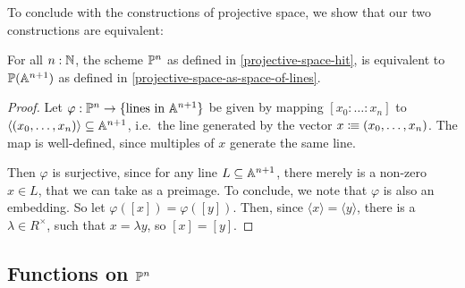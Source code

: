 To conclude with the constructions of projective space,
we show that our two constructions are equivalent:

\begin{proposition}
  \label{space-of-lines-is-projective-space}
  For all $n:\mathbb{N}$, the scheme $\mathbb{P}^n$ as defined in \cref{projective-space-hit},
  is equivalent to $\mathbb{P}(\mathbb{A}^{n+1})$ as defined in \cref{projective-space-as-space-of-lines}.
\end{proposition}

\begin{proof}
  Let $\varphi:\mathbb{P}^n\to \{\text{lines in $\mathbb{A}^{n+1}$}\}$
  be given by mapping $[x_0:\dots:x_n]$ to $\langle (x_0,\dots,x_n)\rangle\subseteq \mathbb{A}^{n+1}$,
  i.e.\ the line generated by the vector $x\vcentcolon\mspace{-1.2mu}\equiv (x_0,\dots,x_n)$.
  The map is well-defined, since multiples of $x$ generate the same line.

  Then $\varphi$ is surjective,
  since for any line $L\subseteq \mathbb{A}^{n+1}$,
  there merely is a non-zero $x\in L$,
  that we can take as a preimage.
  To conclude, we note that $\varphi$ is also an embedding.
  So let $\varphi([x])=\varphi([y])$.
  Then, since $\langle x\rangle=\langle y\rangle$, there is a $\lambda\in R^\times$,
  such that $x=\lambda y$, so $[x]=[y]$.
\end{proof}

\subsection{Functions on $\mathbb{P}^n$}

